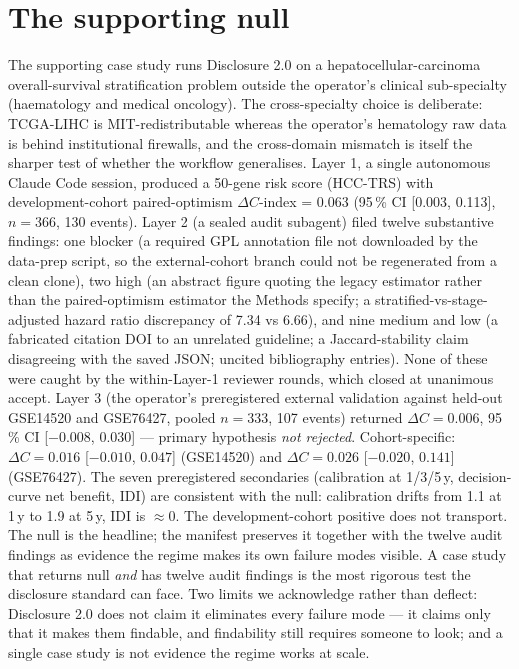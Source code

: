 \documentclass[11pt,a4paper]{article}
\begin{document}
\section{The supporting null}

The supporting case study runs Disclosure 2.0 on a hepatocellular-carcinoma overall-survival stratification problem outside the operator's clinical sub-specialty (haematology and medical oncology). The cross-specialty choice is deliberate: TCGA-LIHC is MIT-redistributable whereas the operator's hematology raw data is behind institutional firewalls, and the cross-domain mismatch is itself the sharper test of whether the workflow generalises. Layer 1, a single autonomous Claude Code session, produced a 50-gene risk score (HCC-TRS) with development-cohort paired-optimism $\Delta C$-index = 0.063 (95\,\% CI [0.003, 0.113], $n=366$, 130 events). Layer 2 (a sealed audit subagent) filed twelve substantive findings: one blocker (a required GPL annotation file not downloaded by the data-prep script, so the external-cohort branch could not be regenerated from a clean clone), two high (an abstract figure quoting the legacy estimator rather than the paired-optimism estimator the Methods specify; a stratified-vs-stage-adjusted hazard ratio discrepancy of 7.34 vs 6.66), and nine medium and low (a fabricated citation DOI to an unrelated guideline; a Jaccard-stability claim disagreeing with the saved JSON; uncited bibliography entries). None of these were caught by the within-Layer-1 reviewer rounds, which closed at unanimous accept. Layer 3 (the operator's preregistered\citep{repoprereg} external validation against held-out GSE14520 and GSE76427, pooled $n=333$, 107 events) returned $\Delta C = 0.006$, 95\,\% CI [$-0.008$, $0.030$] --- primary hypothesis \emph{not rejected}. Cohort-specific: $\Delta C = 0.016$ [$-0.010$, $0.047$] (GSE14520) and $\Delta C = 0.026$ [$-0.020$, $0.141$] (GSE76427). The seven preregistered secondaries (calibration at 1/3/5\,y, decision-curve net benefit, IDI) are consistent with the null: calibration drifts from 1.1 at 1\,y to 1.9 at 5\,y, IDI is $\approx 0$. The development-cohort positive does not transport. The null is the headline; the manifest preserves it together with the twelve audit findings as evidence the regime makes its own failure modes visible. A case study that returns null \emph{and} has twelve audit findings is the most rigorous test the disclosure standard can face. Two limits we acknowledge rather than deflect: Disclosure 2.0 does not claim it eliminates every failure mode --- it claims only that it makes them findable, and findability still requires someone to look; and a single case study is not evidence the regime works at scale.
\end{document}
